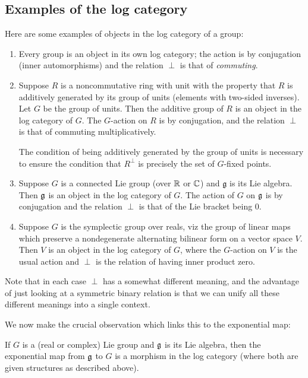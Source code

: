 \documentclass[a4paper]{amsart}
\begin{document}
\subsection{Examples of the log category}

Here are some examples of objects in the log category of a group:

\begin{enumerate}

\item Every group is an object in its own log category; the action is
  by conjugation (inner automorphisms) and the relation $\perp$ is
  that of {\em commuting}.

\item Suppose $R$ is a noncommutative ring with unit with the property
  that $R$ is additively generated by its group of units (elements
  with two-sided inverses). Let $G$ be the group of units. Then the
  additive group of $R$ is an object in the log category of $G$. The
  $G$-action on $R$ is by conjugation, and the relation $\perp$ is
  that of commuting multiplicatively.

  The condition of being additively generated by the group of units is
  necessary to ensure the condition that $R^\perp$ is precisely the
  set of $G$-fixed points.

\item Suppose $G$ is a connected Lie group (over $\mathbb{R}$ or $\mathbb{C}$) and
  $\mathfrak{g}$ is its Lie algebra. Then $\mathfrak{g}$ is an object
  in the log category of $G$. The action of $G$ on $\mathfrak{g}$ is by conjugation
  and the relation $\perp$ is that of the Lie bracket being $0$.

\item Suppose $G$ is the symplectic group over reals, viz the group of
  linear maps which preserve a nondegenerate alternating bilinear form
  on a vector space $V$. Then $V$ is an object in the log category of
  $G$, where the $G$-action on $V$ is the usual action and $\perp$
  is the relation of having inner product zero.

\end{enumerate}

Note that in each case $\perp$ has a somewhat different meaning, and
the advantage of just looking at a symmetric binary relation is that
we can unify all these different meanings into a single context.

We now make the crucial observation which links this to the exponential map:

If $G$ is a (real or complex) Lie group and $\mathfrak{g}$ is its Lie algebra,
then the exponential map from $\mathfrak{g}$ to $G$ is a morphism in the log
category (where both are given structures as described above).
\end{document}
